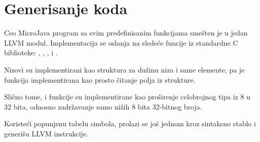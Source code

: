 \section{Generisanje koda}

Ceo MicroJava program sa svim predefinisanim funkcijama smešten je u jedan LLVM modul. Implementacija se oslanja na sledeće funcije iz standardne C biblioteke: ,
, 
, 
 i 
.

Nizovi su implementirani kao struktura  za dužinu niza i same elemente, pa je  funkcija implementirana kao prosto čitanje polja iz strukture.

Slično tome,  i  funkcije su implementirane kao proširenje celobrojnog tipa iz 8 u 32 bita, odnosno zadržavanje samo nižih 8 bita 32-bitnog broja.

Koristeći popunjenu tabelu simbola, prolazi se još jednom kroz sintaksno stablo i generišu LLVM instrukcije.
